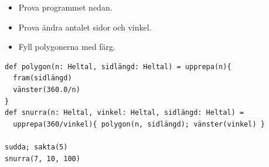 \begin{itemize}

\item {Prova programmet nedan.}
\item {Prova ändra antalet sidor och vinkel.}
\item {Fyll polygonerna med färg.}

\end{itemize}



  

\begin{lstlisting}[basicstyle={\ttfamily\fontsize{16}{19}\selectfont},numbers=none]
def polygon(n: Heltal, sidlängd: Heltal) = upprepa(n){
  fram(sidlängd)
  vänster(360.0/n)
}
def snurra(n: Heltal, vinkel: Heltal, sidlängd: Heltal) = 
  upprepa(360/vinkel){ polygon(n, sidlängd); vänster(vinkel) }

sudda; sakta(5)
snurra(7, 10, 100)
\end{lstlisting}
        

